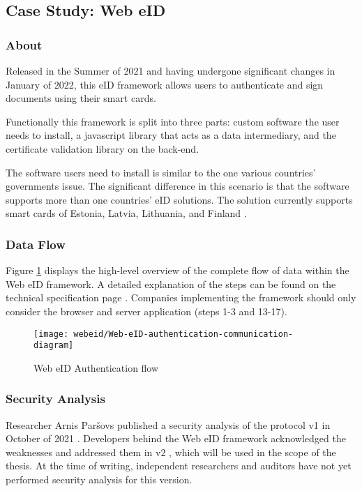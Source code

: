 \subsection{Case Study: Web eID}

\subsubsection{About}

Released in the Summer of 2021 \cite{ria-webeid} and having undergone significant changes in January of 2022, this eID framework allows users to authenticate and sign documents using their smart cards.

Functionally this framework is split into three parts: custom software the user needs to install, a javascript library that acts as a data intermediary, and the certificate validation library on the back-end.

The software users need to install is similar to the one various countries' governments issue. The significant difference in this scenario is that the software supports more than one countries' eID solutions. The solution currently supports smart cards of Estonia, Latvia, Lithuania, and Finland \cite{ria-webeid}.

\subsubsection{Data Flow}

Figure \ref{fig:web-eid-authentication} displays the high-level overview of the complete flow of data within the Web eID framework. A detailed explanation of the steps can be found on the technical specification page \cite{ria-webeid-systemarchitecture}. Companies implementing the framework should only consider the browser and server application (steps 1-3 and 13-17).

\begin{figure}
  \centering
  \texttt{[image: webeid/Web-eID-authentication-communication-diagram]}
  \caption{Web eID Authentication flow \cite{ria-webeid-systemarchitecture}}
  \label{fig:web-eid-authentication}
\end{figure}


\subsubsection{Security Analysis}

Researcher Arnis Paršovs published a security analysis of the protocol v1 in October of 2021 \cite{arnis-report-webeid}. Developers behind the Web eID framework acknowledged the weaknesses and addressed them in v2 \cite{ria-webeid-systemarchitecture}, which will be used in the scope of the thesis. At the time of writing, independent researchers and auditors have not yet performed security analysis for this version.

